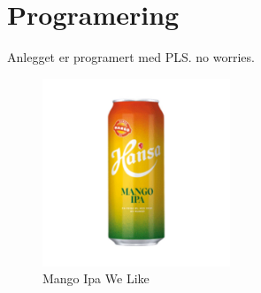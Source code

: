 \chapter{Programering}
\thispagestyle{fancy}
Anlegget er programert med PLS. no worries.

\begin{figure}[htbp]
    \centering
    \includegraphics[width=0.5\textwidth]{Bilder/mango.jpg}
    \caption{Mango Ipa We Like}\label{fig:Mango-Jau}
\end{figure}
    